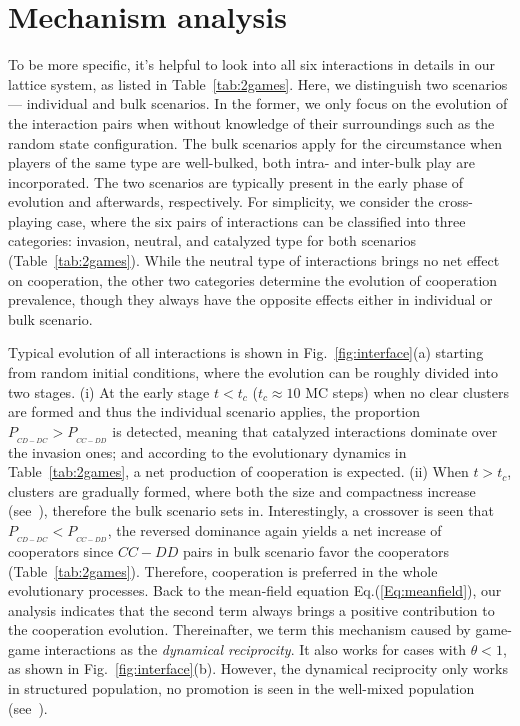 \documentclass[doublecol]{epl2}
\begin{document}
\section{Mechanism analysis}
To be more specific, it's helpful to look into all six interactions in details in our lattice system, as listed in Table~\ref{tab:2games}.
Here, we distinguish two scenarios --- individual and bulk scenarios. In the former, we only focus on the evolution of the interaction pairs when without knowledge of their surroundings such as the random state configuration. The bulk scenarios apply for the circumstance when players of the same type are well-bulked, both intra- and inter-bulk play are incorporated. The two scenarios are typically present in the early phase of evolution and afterwards, respectively. For simplicity, we consider the cross-playing case, where the six pairs of interactions can be classified into three categories: invasion, neutral, and catalyzed type for both scenarios (Table~\ref{tab:2games}). While the neutral type of interactions brings no net effect on cooperation, the other two categories determine the evolution of cooperation prevalence, though they always have the opposite effects either in individual or bulk scenario.

Typical evolution of all interactions is shown in Fig.~\ref{fig:interface}(a) starting from random initial conditions, where the evolution can be roughly divided into two stages. (i) At the early stage $t\!<\!t_c$ ($t_c\!\approx\!10$ MC steps) when no clear clusters are formed and thus the individual scenario applies, the proportion $P_{_{CD-DC}}>P_{_{CC-DD}}$ is detected, meaning that catalyzed interactions dominate over the invasion ones; and according to the evolutionary dynamics in Table~\ref{tab:2games}, a net production of cooperation is expected. (ii) When $t>t_c$, clusters are gradually formed, where both the size and compactness increase (see~\cite{Liang2021arXiv}), therefore the bulk scenario sets in. Interestingly, a crossover is seen that $P_{_{CD-DC}}<P_{_{CC-DD}}$, the reversed dominance again yields a net increase of cooperators since $CC\!-\!DD$ pairs in bulk scenario favor the cooperators (Table~\ref{tab:2games}). Therefore, cooperation is preferred in the whole evolutionary processes.
Back to the mean-field equation Eq.(\ref{Eq:meanfield}), our analysis indicates that the second term always brings a positive contribution to the cooperation evolution. Thereinafter, we term this mechanism caused by game-game interactions as the \emph{dynamical reciprocity}.
It also works for cases with $\theta<1$, as shown in Fig.~\ref{fig:interface}(b). However, the dynamical reciprocity only works in structured population, no promotion is seen in the well-mixed population (see~\cite{Liang2021arXiv}). %
\end{document}
